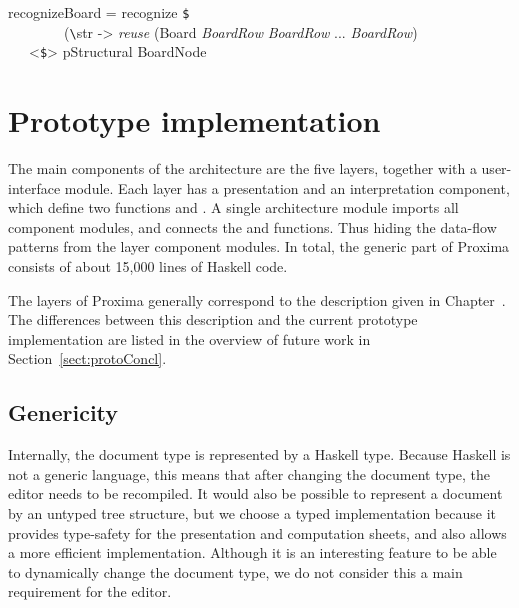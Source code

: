 \ttfamily\begin{small}\begin{tabbing}
recognizeBoard = recognize \verb|$|\\
~~~~~~~~(\verb|\|str -> {\em reuse} (Board {\em BoardRow} {\em BoardRow} ... {\em BoardRow})\\
~~~<\verb|$|> pStructural BoardNode\\
\end{tabbing}\end{small}\rmfamily


%																
%																
%																
\section{Prototype implementation} \label{sect:proxImpl}


The main components of the architecture are the five layers, together with a user-interface module. 
Each layer has a presentation and an interpretation component, which define two functions  and . A single architecture module imports all component modules, and connects the   and  functions. Thus hiding the data-flow patterns from the layer component modules. In total, the generic part of Proxima consists of about 15,000 lines of Haskell code. 


%
%

\bc
The layers of Proxima generally correspond to the description given in Chapter~. The differences between this description and the current prototype implementation are listed in the overview of future work in  Section~\ref{sect:protoConcl}. 
\ec

\subsection{Genericity}

Internally, the document type is represented by a Haskell type. Because Haskell is not a generic language, this means that after changing the document type, the editor needs to be recompiled. It would also be possible to represent a document by an untyped tree structure, but we choose a typed implementation because it provides type-safety for the presentation and computation sheets, and also allows a more efficient implementation. Although it is an interesting feature to be able to dynamically change the document type, we do not consider this a main requirement for the editor.

